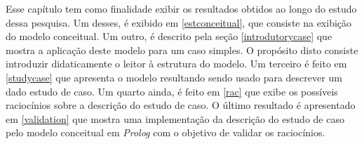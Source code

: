 Esse capítulo tem como finalidade exibir os resultados obtidos ao longo do estudo dessa pesquisa. Um desses, é exibido em \ref{estconceitual}, que consiste na exibição do modelo conceitual. Um outro, é descrito pela seção \ref{introdutorycase} que mostra a aplicação deste modelo para um caso simples. O propósito disto consiste introduzir didaticamente o leitor à estrutura do modelo. Um terceiro é feito em \ref{studycase} que apresenta o modelo resultando sendo usado para descrever um dado estudo de caso. Um quarto ainda, é feito em \ref{rac} que exibe os possíveis raciocínios sobre a descrição do estudo de caso. O último resultado é apresentado em \ref{validation} que mostra uma implementação da descrição do estudo de caso pelo modelo conceitual em \textit{Prolog} com o objetivo de validar os raciocínios.